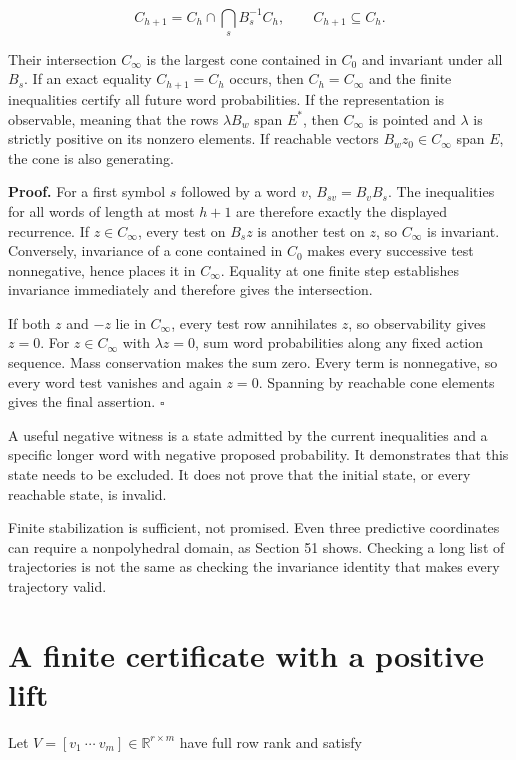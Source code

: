 \[
C_{h+1}=C_h\cap\bigcap_s B_s^{-1}C_h,
\qquad C_{h+1}\subseteq C_h.
\]

Their intersection \(C_\infty\) is the largest cone contained in \(C_0\)
and invariant under all \(B_s\). If an exact equality \(C_{h+1}=C_h\)
occurs, then \(C_h=C_\infty\) and the finite inequalities certify all
future word probabilities. If the representation is observable, meaning
that the rows \(\lambda B_w\) span \(E^*\), then \(C_\infty\) is pointed
and \(\lambda\) is strictly positive on its nonzero elements. If
reachable vectors \(B_wz_0\in C_\infty\) span \(E\), the cone is also
generating.

\textbf{Proof.} For a first symbol \(s\) followed by a word \(v\),
\(B_{sv}=B_vB_s\). The inequalities for all words of length at most
\(h+1\) are therefore exactly the displayed recurrence. If
\(z\in C_\infty\), every test on \(B_sz\) is another test on \(z\), so
\(C_\infty\) is invariant. Conversely, invariance of a cone contained in
\(C_0\) makes every successive test nonnegative, hence places it in
\(C_\infty\). Equality at one finite step establishes invariance
immediately and therefore gives the intersection.

If both \(z\) and \(-z\) lie in \(C_\infty\), every test row annihilates
\(z\), so observability gives \(z=0\). For \(z\in C_\infty\) with
\(\lambda z=0\), sum word probabilities along any fixed action sequence.
Mass conservation makes the sum zero. Every term is nonnegative, so
every word test vanishes and again \(z=0\). Spanning by reachable cone
elements gives the final assertion. \(\square\)

A useful negative witness is a state admitted by the current
inequalities and a specific longer word with negative proposed
probability. It demonstrates that this state needs to be excluded. It
does not prove that the initial state, or every reachable state, is
invalid.

Finite stabilization is sufficient, not promised. Even three predictive
coordinates can require a nonpolyhedral domain, as Section 51 shows.
Checking a long list of trajectories is not the same as checking the
invariance identity that makes every trajectory valid.

\section{A finite certificate with a positive lift}\label{LSM:a-finite-certificate-with-a-positive-lift}

Let \(V=[v_1\ \cdots\ v_m]\in\mathbb R^{r\times m}\) have full row rank
and satisfy

